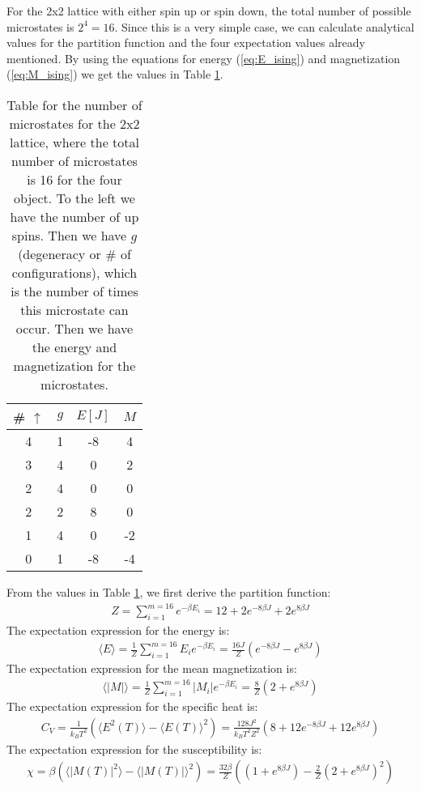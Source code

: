 \documentclass[12pt,a4paper,english]{article}
\begin{document}
For the 2x2 lattice with either spin up or spin down, the total number of possible microstates is $2^4=16$. Since this is a very simple case, we can calculate analytical values for the partition function and the four expectation values already mentioned. By using the equations for energy (\ref{eq:E_ising}) and magnetization (\ref{eq:M_ising}) we get the values in Table \ref{tab:analytic}.

\begin{table}[htbp]
	\centering
	\begin{tabular}{ |c|c|c|c| }
		\hline \rule{0pt}{13pt}
		\# $\uparrow$ & $g$ & $E[J]$ & $M$ \\
		\hline \rule{0pt}{13pt}
		4 & 1 & -8 & 4 \\
		\hline \rule{0pt}{13pt}
		3 & 4 & 0 & 2  \\
		\hline \rule{0pt}{13pt}
		2 & 4 & 0 & 0 \\
		\hline \rule{0pt}{13pt}
		2 & 2 & 8 & 0 \\
		\hline \rule{0pt}{13pt}
		1 & 4 & 0 & -2 \\
		\hline \rule{0pt}{13pt}
		0 & 1 & -8 & -4 \\
		\hline 
	\end{tabular}	
	\caption{Table for the number of microstates for the 2x2 lattice, where the total number of microstates is 16 for the four object. To the left we have the number of up spins. Then we have $g$ (degeneracy or \# of configurations), which is the number of times this microstate can occur. Then we have the energy and magnetization for the microstates.}
	\label{tab:analytic}
\end{table}
From the values in Table \ref{tab:analytic}, we first derive the partition function:
\begin{align}
\label{eq:Z_analytic}
Z=\sum_{i=1}^{m=16}e^{-\beta E_i}=12+2e^{-8\beta J}+2e^{8\beta J}
\end{align}
The expectation expression for the energy is:
\begin{align}
\label{eq:E_analytic}
\langle E\rangle=\frac{1}{Z}\sum_{i=1}^{m=16}E_ie^{-\beta E_i}=\frac{16J}{Z}\left(e^{-8\beta J}-e^{8\beta J}\right)
\end{align}
The expectation expression for the mean magnetization is:
\begin{align}
\label{eq:M_analytic}
\langle |M|\rangle=\frac{1}{Z}\sum_{i=1}^{m=16}|M_i|e^{-\beta E_i}=\frac{8}{Z}\left(2+e^{8\beta J}
\right)
\end{align}
The expectation expression for the specific heat is:
\begin{align}
\label{eq:CV_analytic}
C_V=\frac{1}{k_BT^2}\left(\langle E^2(T)\rangle-\langle E(T)\rangle^2\right)=\frac{128J^2}{k_BT^2Z^2}\left(8+12e^{-8\beta J}+12e^{8\beta J}\right)
\end{align}
The expectation expression for the susceptibility is:
\begin{align}
\label{eq:Xi_analytic}
\chi=\beta\left(\langle |M(T)|^2\rangle-\langle |M(T)|\rangle^2\right)=\frac{32\beta}{Z}\left((1+e^{8\beta J})-\frac{2}{Z}(2+e^{8\beta J})^2\right)
\end{align}
\end{document}
